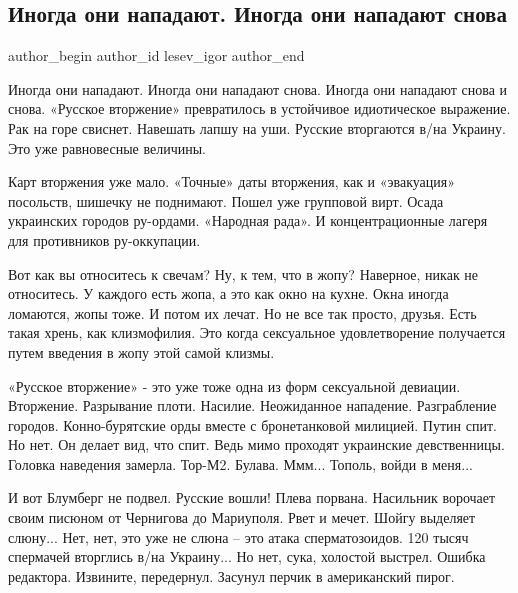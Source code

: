  
 
 
 
 
 
\subsection{Иногда они нападают. Иногда они нападают снова}
\label{sec:05_02_2022.tg.lesev_igor.1.inogda_oni_napadajut}
 
\ifcmt
 author_begin
   author_id lesev_igor
 author_end
\fi

Иногда они нападают. Иногда они нападают снова. Иногда они нападают снова и
снова. «Русское вторжение» превратилось в устойчивое идиотическое выражение.
Рак на горе свиснет. Навешать лапшу на уши. Русские вторгаются в/на Украину.
Это уже равновесные величины.

Карт вторжения уже мало. «Точные» даты вторжения, как и «эвакуация» посольств,
шишечку не поднимают. Пошел уже групповой вирт. Осада украинских городов
ру-ордами. «Народная рада». И концентрационные лагеря для противников
ру-оккупации.

Вот как вы относитесь к свечам? Ну, к тем, что в жопу? Наверное, никак не
относитесь. У каждого есть жопа, а это как окно на кухне. Окна иногда ломаются,
жопы тоже. И потом их лечат. Но не все так просто, друзья. Есть такая хрень,
как клизмофилия. Это когда сексуальное удовлетворение получается путем введения
в жопу этой самой клизмы.

«Русское вторжение» - это уже тоже одна из форм сексуальной девиации.
Вторжение. Разрывание плоти. Насилие. Неожиданное нападение. Разграбление
городов. Конно-бурятские орды вместе с бронетанковой милицией. Путин спит. Но
нет. Он делает вид, что спит. Ведь мимо проходят украинские девственницы.
Головка наведения замерла. Тор-М2. Булава. Ммм... Тополь, войди в меня...

И вот Блумберг не подвел. Русские вошли! Плева порвана. Насильник ворочает
своим писюном от Чернигова до Мариуполя. Рвет и мечет. Шойгу выделяет слюну...
Нет, нет, это уже не слюна – это атака сперматозоидов. 120 тысяч спермачей
вторглись в/на Украину... Но нет, сука, холостой выстрел. Ошибка редактора.
Извините, передернул. Засунул перчик в американский пирог.

